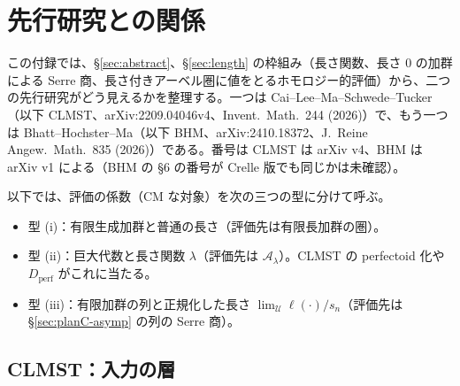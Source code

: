 \documentclass[11pt,a4paper]{ltjsarticle}
\numberwithin{equation}{section}
\theoremstyle{plain}
\theoremstyle{definition}
\theoremstyle{definition}
\newcommand{\U}{\mathcal{U}}
\begin{document}
\section{先行研究との関係}\label{sec:prior}

この付録では、§\ref{sec:abstract}、§\ref{sec:length} の枠組み（長さ関数、長さ $0$ の加群による Serre 商、長さ付きアーベル圏に値をとるホモロジー的評価）から、二つの先行研究がどう見えるかを整理する。一つは Cai--Lee--Ma--Schwede--Tucker（以下 CLMST、arXiv:2209.04046v4、Invent.\ Math.\ 244 (2026)）で、もう一つは Bhatt--Hochster--Ma（以下 BHM、arXiv:2410.18372、J.\ Reine Angew.\ Math.\ 835 (2026)）である。番号は CLMST は arXiv v4、BHM は arXiv v1 による（BHM の §6 の番号が Crelle 版でも同じかは未確認）。

以下では、評価の係数（CM な対象）を次の三つの型に分けて呼ぶ。
\begin{itemize}
  \item 型 (i)：有限生成加群と普通の長さ（評価先は有限長加群の圏）。
  \item 型 (ii)：巨大代数と長さ関数 $\lambda$（評価先は $\mathcal{A}_\lambda$）。CLMST の perfectoid 化や $D_{\mathrm{perf}}$ がこれに当たる。
  \item 型 (iii)：有限加群の列と正規化した長さ $\lim_\U\ell(\cdot)/s_n$（評価先は §\ref{sec:planC-asymp} の列の Serre 商）。
\end{itemize}

\subsection{CLMST：入力の層}\label{sec:prior-clmst}
\end{document}
